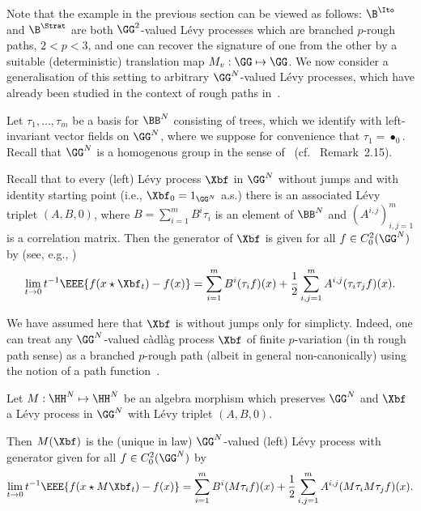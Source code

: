 \documentclass{article}
\begin{document}
Note that the example in the previous section can be viewed as follows: $\B^\Ito$ and $\B^{\Strat}$ are both $\GG^2$-valued L{\'e}vy processes which are branched $p$-rough paths, $2 < p < 3$, and one can recover the signature of one from the other by a suitable (deterministic) translation map $M_v : \GG \mapsto \GG$. We now consider a generalisation of this setting to arbitrary $\GG^N$-valued L{\'e}vy processes, which have already been studied in the context of rough paths in~\cite{FrizShekhar14, Chevyrev15}.


Let $\tau_1,\ldots, \tau_m$ be a basis for $\BB^N$ consisting of trees, which we identify with left-invariant vector fields on $\GG^N$, where we suppose for convenience that $\tau_1 = \bullet_0$.
Recall that $\GG^N$ is a homogenous group in the sense of~\cite{FollandStein82} (cf.~\cite{HairerKelly15} Remark~2.15).

Recall that to every (left) L{\'e}vy process $\Xbf$ in $\GG^N$ without jumps and with identity starting point (i.e., $\Xbf_0 = 1_{\GG^N}$  a.s.) there is an associated L{\'e}vy triplet $(A,B,0)$, where $B = \sum_{i=1}^m B^i \tau_i$ is an element of $\BB^N$ and $(A^{i,j})_{i,j=1}^m$ is a correlation matrix. Then the generator of $\Xbf$ is given for all $f \in C^2_0(\GG^N)$ by (see, e.g., \cite{Liao04})
\[
\lim_{t \rightarrow 0} t^{-1}\EEE{f(x\star\Xbf_t) - f(x)} = \sum_{i=1}^m B^i (\tau_i f) (x) + \frac{1}{2}\sum_{i,j=1}^m A^{i,j} (\tau_i\tau_j f)(x).
\]

\begin{remark}
We have assumed here that $\Xbf$ is without jumps only for simplicty. Indeed, one can treat any $\GG^N$-valued c{\`a}dl{\`a}g process $\Xbf$ of finite $p$-variation (in th rough path sense) as a branched $p$-rough path (albeit in general non-canonically) using the notion of a path function~\cite{Chevyrev15}.
\end{remark}

\begin{lemma}\label{lem:LevyTriplet}
Let $M : \HH^N \mapsto \HH^N$ be an algebra morphism which preserves $\GG^N$ and $\Xbf$ a L{\'e}vy process in $\GG^N$ with L{\'e}vy triplet $(A,B,0)$.

Then $M(\Xbf)$ is the (unique in law) $\GG^N$-valued (left) L{\'e}vy process with generator given for all $f \in C^2_0(\GG^N)$ by
\begin{equation}\label{eq:LevyGen}
\lim_{t \rightarrow 0} t^{-1}\EEE{f(x \star M\Xbf_t) - f(x)} = \sum_{i=1}^m B^i (M\tau_i f) (x) + \frac{1}{2}\sum_{i,j=1}^m A^{i,j} (M\tau_i M\tau_j f)(x).
\end{equation}
\end{lemma}
\end{document}
